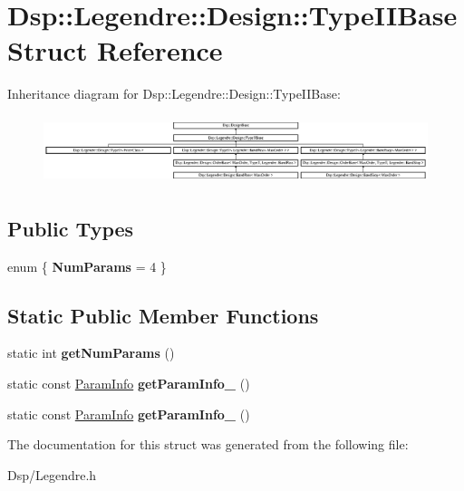 \hypertarget{structDsp_1_1Legendre_1_1Design_1_1TypeIIBase}{\section{Dsp\-:\-:Legendre\-:\-:Design\-:\-:Type\-I\-I\-Base Struct Reference}
\label{structDsp_1_1Legendre_1_1Design_1_1TypeIIBase}
}
Inheritance diagram for Dsp\-:\-:Legendre\-:\-:Design\-:\-:Type\-I\-I\-Base\-:\begin{figure}[H]
\begin{center}
\leavevmode
\includegraphics[height=2.007169cm]{structDsp_1_1Legendre_1_1Design_1_1TypeIIBase}
\end{center}
\end{figure}
\subsection*{Public Types}
\begin{DoxyCompactItemize}
\item 
enum \{ {\bfseries Num\-Params} =  4
 \}
\end{DoxyCompactItemize}
\subsection*{Static Public Member Functions}
\begin{DoxyCompactItemize}
\item 
\hypertarget{structDsp_1_1Legendre_1_1Design_1_1TypeIIBase_a32c0bed9b2eb96353a1ee20add770d18}{static int {\bfseries get\-Num\-Params} ()}\label{structDsp_1_1Legendre_1_1Design_1_1TypeIIBase_a32c0bed9b2eb96353a1ee20add770d18}

\item 
\hypertarget{structDsp_1_1Legendre_1_1Design_1_1TypeIIBase_a646d666e1deda352b20327665061abb8}{static const \hyperlink{classDsp_1_1ParamInfo}{Param\-Info} {\bfseries get\-Param\-Info\-\_} ()}\label{structDsp_1_1Legendre_1_1Design_1_1TypeIIBase_a646d666e1deda352b20327665061abb8}

\item 
\hypertarget{structDsp_1_1Legendre_1_1Design_1_1TypeIIBase_a4882282750f8a02597e859957071c73b}{static const \hyperlink{classDsp_1_1ParamInfo}{Param\-Info} {\bfseries get\-Param\-Info\-\_} ()}\label{structDsp_1_1Legendre_1_1Design_1_1TypeIIBase_a4882282750f8a02597e859957071c73b}

\end{DoxyCompactItemize}


The documentation for this struct was generated from the following file\-:\begin{DoxyCompactItemize}
\item 
Dsp/Legendre.\-h\end{DoxyCompactItemize}
